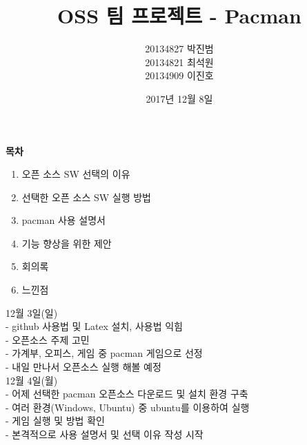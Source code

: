 \documentclass{article}
\begin{document}
 
\title{\textbf{OSS 팀 프로젝트 - Pacman}}
\author {20134827 박진범\\20134821 최석원\\20134909 이진호}
\date{2017년 12월 8일}
\maketitle
 
 
 
\newpage
\begin{huge}\begin{center}\textbf{목차\\}\end{center}\end{huge}
 
\begin{enumerate}
 
\item 오픈 소스 SW 선택의 이유
\item 선택한 오픈 소스 SW 실행 방법
\item pacman 사용 설명서
\item 기능 향상을 위한 제안
\item 회의록 
\item 느낀점 
 
 
\end{enumerate}
 
\newpage
12월 3일(일)\\
 
- github 사용법 및 Latex 설치, 사용법 익힘\\
 
- 오픈소스 주제 고민\\
 
- 가계부, 오피스, 게임 중 pacman 게임으로 선정\\
 
- 내일 만나서 오픈소스 실행 해볼 예정\\
 
12월 4일(월)\\
 
- 어제 선택한 pacman 오픈소스 다운로드 및 설치 환경 구축\\
 
- 여러 환경(Windows, Ubuntu) 중 ubuntu를 이용하여 실행\\
 
- 게임 실행 및 방법 확인\\
 
- 본격적으로 사용 설명서 및 선택 이유 작성 시작\\
 
\end{document}
